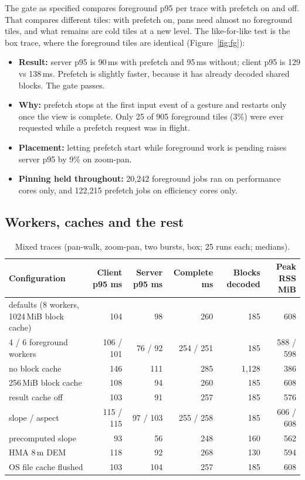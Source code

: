 \documentclass[11pt,a4paper]{article}
\begin{document}
The gate as specified compares foreground p95 per trace with prefetch on and off. That compares different tiles:
with prefetch on, pans need almost no foreground tiles, and what remains are cold tiles at a new level. The
like-for-like test is the box trace, where the foreground tiles are identical (Figure~\ref{fig:fg}):
\begin{itemize}
  \item \textbf{Result:} server p95 is 90\,ms with prefetch and 95\,ms without; client p95 is 129 vs 138\,ms.
  Prefetch is slightly faster, because it has already decoded shared blocks. The gate passes.
  \item \textbf{Why:} prefetch stops at the first input event of a gesture and restarts only once the view is
  complete. Only 25 of 905 foreground tiles (3\%) were ever requested while a prefetch request was in flight.
  \item \textbf{Placement:} letting prefetch start while foreground work is pending raises server p95 by 9\% on
  zoom-pan.
  \item \textbf{Pinning held throughout:} 20{,}242 foreground jobs ran on performance cores only, and 122{,}215
  prefetch jobs on efficiency cores only.
\end{itemize}

\subsection{Workers, caches and the rest}
\begin{table}[!htbp]
\centering\small
\caption{Mixed traces (pan-walk, zoom-pan, two bursts, box; 25 runs each; medians).}
\label{tab:mixed}
\begin{tabularx}{\linewidth}{lRRRRR}
\toprule
Configuration & Client p95 ms & Server p95 ms & Complete ms & Blocks decoded & Peak RSS MiB \\
\midrule
defaults (8 workers, 1024\,MiB block cache) & 104 & 98 & 260 & 185 & 608 \\
4 / 6 foreground workers & 106 / 101 & 76 / 92 & 254 / 251 & 185 & 588 / 598 \\
no block cache & 146 & 111 & 285 & 1{,}128 & 386 \\
256\,MiB block cache & 108 & 94 & 260 & 185 & 608 \\
result cache off & 103 & 91 & 257 & 185 & 576 \\
slope / aspect & 115 / 115 & 97 / 103 & 255 / 258 & 185 & 606 / 608 \\
precomputed slope & 93 & 56 & 248 & 160 & 562 \\
HMA 8\,m DEM & 118 & 92 & 268 & 130 & 594 \\
OS file cache flushed & 103 & 104 & 257 & 185 & 608 \\
\bottomrule
\end{tabularx}
\end{table}
\end{document}
